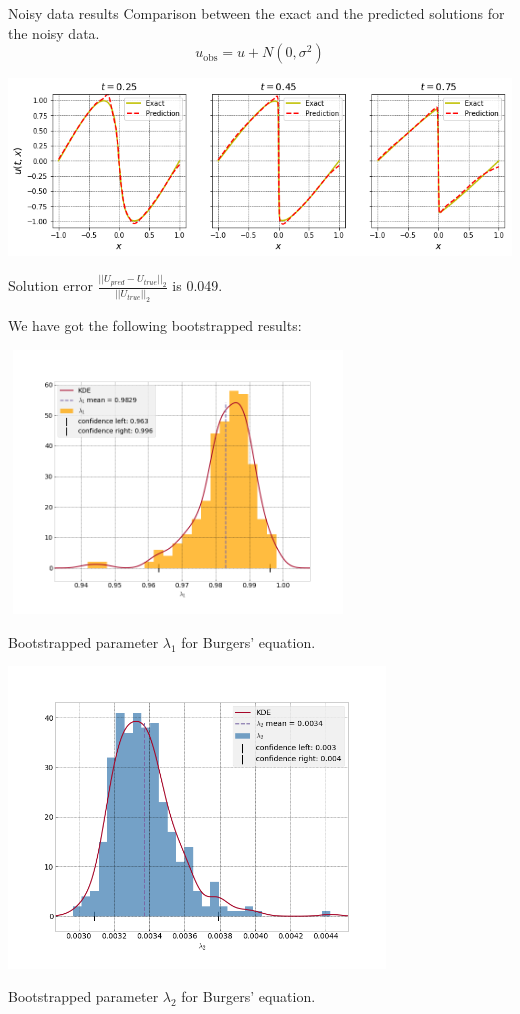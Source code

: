 \documentclass{beamer}
\begin{document}
\begin{frame}{Noisy data results}
Comparison between the exact and the predicted solutions for the noisy data.
\[
    u_{\textrm{obs}} = u + N(0, \sigma^2)
\]

\vspace{0.3cm}
\centering
\includegraphics[scale = 0.41]{images/burgers-exact-pred-noisy.png}

Solution error $\frac{||U_{pred} - U_{true}||_2}{||U_{true}||_2}$ is 0.049.
\end{frame}

\begin{frame}{}
We have got the following bootstrapped results:

\centering
\includegraphics[width = 9cm , height = 7cm]{images/burgers-bootstraped_l1.png}

Bootstrapped parameter $\lambda_1$ for Burgers' equation.
\end{frame}

\begin{frame}
\centering
\includegraphics[width = 10cm , height = 8cm]{images/burgers-bootstraped_l2.png}

Bootstrapped parameter $\lambda_2$ for Burgers' equation.
\end{frame}
\end{document}
